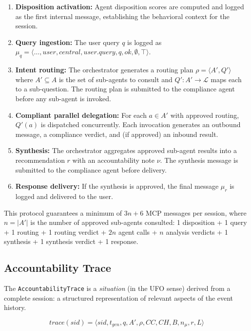 \documentclass[runningheads]{llncs}
\begin{document}
\begin{enumerate}
    \item \textbf{Disposition activation:} Agent disposition scores are
    computed and logged as the first internal message, establishing the
    behavioral context for the session.
    \item \textbf{Query ingestion:} The user query $q$ is logged as
    $\mu_q = \langle \ldots, \mathit{user}, \mathit{central},
    \mathit{user.query}, q, \mathit{ok}, \emptyset, \top \rangle$.
    \item \textbf{Intent routing:} The orchestrator generates a routing
    plan $\rho = \langle A', Q' \rangle$ where $A' \subseteq A$ is the
    set of sub-agents to consult and $Q': A' \rightarrow \mathcal{L}$
    maps each to a sub-question. The routing plan is submitted to the
    compliance agent before any sub-agent is invoked.
    \item \textbf{Compliant parallel delegation:} For each $a \in A'$
    with approved routing, $Q'(a)$ is dispatched concurrently. Each
    invocation generates an outbound message, a compliance verdict, and
    (if approved) an inbound result.
    \item \textbf{Synthesis:} The orchestrator aggregates approved
    sub-agent results into a recommendation $r$ with an accountability
    note $\nu$. The synthesis message is submitted to the compliance agent
    before delivery.
    \item \textbf{Response delivery:} If the synthesis is approved, the
    final message $\mu_r$ is logged and delivered to the user.
\end{enumerate}

This protocol guarantees a minimum of $3n + 6$ MCP messages per session,
where $n = |A'|$ is the number of approved sub-agents consulted:
1 disposition + 1 query + 1 routing + 1 routing verdict + $2n$ agent
calls + $n$ analysis verdicts + 1 synthesis + 1 synthesis verdict +
1 response.

\subsection{Accountability Trace}
\label{sec:trace}

The \texttt{AccountabilityTrace} is a \emph{situation} (in the UFO
sense) derived from a complete session: a structured representation of
relevant aspects of the event history.

\begin{equation}
\mathit{trace}(\mathit{sid}) = \langle \mathit{sid}, t_{\mathit{gen}},
    q, A', \rho, \mathit{CC}, \mathit{CH}, B, n_\mu, r, L \rangle
\end{equation}
\end{document}
